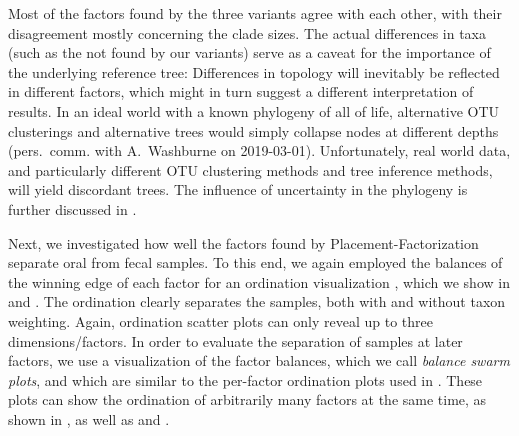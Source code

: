 Most of the factors found by the three variants agree with each other,
with their disagreement mostly concerning the clade sizes.
The actual differences in taxa (such as the  not found by our variants)
serve as a caveat for the importance of the underlying reference tree:
Differences in topology will inevitably be reflected in different factors,
which might in turn suggest a different interpretation of results.
In an ideal world with a known phylogeny of all of life, alternative OTU clusterings and alternative trees
would simply collapse nodes at different depths (pers.~comm. with A.~Washburne on 2019-03-01).
Unfortunately, real world data, and particularly different OTU clustering methods and tree inference methods,
will yield discordant trees.
The influence of uncertainty in the phylogeny is further discussed in \cite{Washburne2019}.


Next, we investigated how well the factors found by Placement-Factorization separate oral from fecal samples.
To this end, we again employed the balances of the winning edge of each factor for an ordination visualization \cite{Washburne2017a},
which we show in 
and .
The ordination clearly separates the samples, both with and without taxon weighting.
Again, ordination scatter plots can only reveal up to three dimensions/factors.
In order to evaluate the separation of samples at later factors,
we use a visualization of the factor balances, which we call \emph{balance swarm plots},
and which are similar to the per-factor ordination plots used in \cite{Washburne2019}.
These plots can show the ordination of arbitrarily many factors at the same time,
as shown in ,
as well as 
and .

